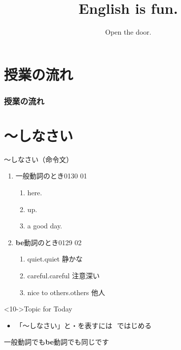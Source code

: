 \documentclass[aspectratio=169,xcolor={dvipsnames,table}]{beamer}
\title{English is fun.}
\subtitle{Open the door.
}
\author{}
\institute[]{}
\date[]
\begin{document}
\begin{frame}[plain]
  \titlepage
\end{frame}

\section*{授業の流れ}
\begin{frame}[plain]
  \frametitle{授業の流れ}
  \tableofcontents
\end{frame}

\section{〜しなさい}
\begin{frame}[plain]{～しなさい（命令文）}
  \large

  \begin{enumerate}
    \item<2-> 一般動詞のとき\hfill{\tiny 0130}\,{\scriptsize {}}\,{\tiny 01}
          \begin{enumerate}
            \item<4->  here.
            \item<5->  up.
            \item<6->  a good day.

          \end{enumerate}
    \item<3-> \textbf{be}動詞のとき\hfill{\tiny 0129}\,{\scriptsize {}}\,{\tiny 02}
          \begin{enumerate}
            \item<7->  quiet.\hfill{\scriptsize quiet  静かな}
            \item<8->  careful.\hfill{\scriptsize careful  注意深い}
            \item<9->  nice to others.\hfill{\scriptsize others 他人}\\%

          \end{enumerate}
  \end{enumerate}

  \begin{block}<10->{Topic for Today}
    \begin{itemize}[square]\small
      \item 「～しなさい」と・を表すには\,\,\,\,ではじめる
    \end{itemize}
    \hfill{\scriptsize 一般動詞でも\textbf{be}動詞でも同じです}
  \end{block}

\end{frame}
\end{document}
